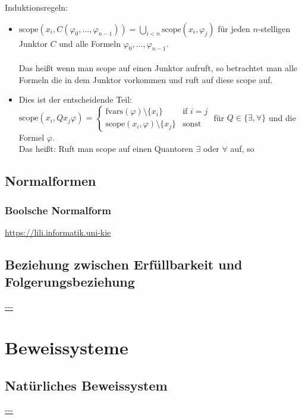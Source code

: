 \documentclass[twocolumn]{article}
\begin{document}
    Induktionsregeln:
    \begin{itemize}
        \item $\text{scope}(x_i, C(\varphi_0, \dots, \varphi_{n-1})) = \bigcup_{i<n} \text{scope}(x_i, \varphi_j)$ für jeden $n$-stelligen Junktor $C$ und alle Formeln $\varphi_0, \dots, \varphi_{n-1}$.\\\\
            Das heißt wenn man scope auf einen Junktor aufruft, so betrachtet man alle Formeln die in dem Junktor vorkommen und ruft auf diese scope auf.
        \item 
            Dies ist der entscheidende Teil:\\
            $\text{scope}(x_i, Q x_j \varphi) = \begin{cases}\text{fvars}(\varphi) \setminus \{x_i\} & \text{if $i = j$}\\ \text{scope}(x_i, \varphi) \setminus \{x_j\} & \text{sonst}\end{cases}$ für $Q \in \{\exists, \forall\}$ und die Formel $\varphi$.\\
            Das heißt: Ruft man scope auf einen Quantoren $\exists$ oder $\forall$ auf, so 
            
    \end{itemize}
    
    \subsection{Normalformen}
    \subsubsection{Boolsche Normalform}
    \url{https://lili.informatik.uni-kie}\\

    \subsection{Beziehung zwischen Erfüllbarkeit und Folgerungsbeziehung}
    \url{---}\\

    \section{Beweissysteme}

    \subsection{Natürliches Beweissystem}
    \url{---}\\
\end{document}
